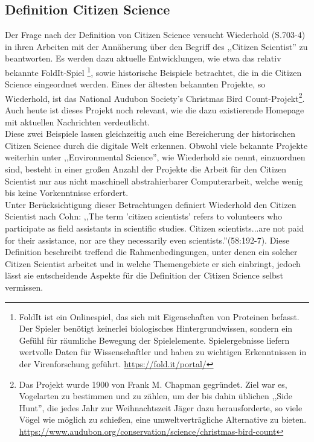 \documentclass{article}
\begin{document}
\subsection{Definition Citizen Science}
Der Frage nach der Definition von Citizen Science versucht Wiederhold\cite{Wiederhold} (S.703-4) in ihren Arbeiten mit der Annäherung über den Begriff des ,,Citizen Scientist'' zu beantworten.
Es werden dazu aktuelle Entwicklungen, wie etwa das relativ bekannte FoldIt-Spiel \footnote{
FoldIt ist ein Onlinespiel, das sich mit Eigenschaften von Proteinen befasst. Der Spieler benötigt keinerlei biologisches Hintergrundwissen,
sondern ein Gefühl für räumliche Bewegung der Spielelemente.
Spielergebnisse liefern wertvolle Daten für Wissenschaftler und haben zu wichtigen Erkenntnissen in der Virenforschung geführt. \url{https://fold.it/portal/}},
sowie historische Beispiele betrachtet, die in die Citizen Science eingeordnet werden.
Eines der ältesten bekannten Projekte, so Wiederhold, ist das National Audubon Society's Christmas Bird Count-Projekt\footnote{Das Projekt wurde 1900 von Frank M. Chapman gegründet.
Ziel war es, Vogelarten zu bestimmen und zu zählen, um der bis dahin üblichen ,,Side Hunt'',
die jedes Jahr zur Weihnachtszeit Jäger dazu herausforderte, so viele Vögel wie möglich zu schießen,
eine umweltverträgliche Alternative zu bieten. \url{https://www.audubon.org/conservation/science/christmas-bird-count}}.
Auch heute ist dieses Projekt noch relevant, wie die dazu existierende Homepage mit aktuellen Nachrichten verdeutlicht.\\
Diese zwei Beispiele lassen gleichzeitig auch eine Bereicherung der historischen Citizen Science durch die digitale Welt erkennen.
Obwohl viele bekannte Projekte weiterhin unter ,,Environmental Science'', wie Wiederhold sie nennt, einzuordnen sind,
besteht in einer großen Anzahl der Projekte die Arbeit für den Citizen Scientist nur aus nicht maschinell abstrahierbarer Computerarbeit,
welche wenig bis keine Vorkenntnisse erfordert.\\
Unter Berücksichtigung dieser Betrachtungen definiert Wiederhold den Citizen Scientist nach Cohn\cite{Cohn}:
,,The term 'citizen scientists' refers to volunteers who participate as field assistants in scientific studies.
Citizen scientists...are not paid for their assistance, nor are they necessarily even scientists.''(58:192-7).
Diese Definition beschreibt treffend die Rahmenbedingungen, unter denen ein solcher Citizen Scientist arbeitet
und in welche Themengebiete er sich einbringt, jedoch lässt sie entscheidende Aspekte für die Definition der Citizen Science selbst vermissen.\\
\end{document}
